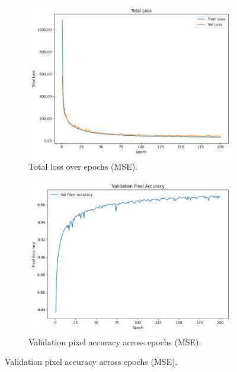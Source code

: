 \begin{figure}[htbp]
    \begin{subfigure}[b]{0.45\textwidth}
        \includegraphics[width=\textwidth]{img/vae_results/200_epochs_128_ls_mse/mse_total_loss.png}
        \caption{Total loss over epochs (MSE).}
        \label{fig:mse_total_loss}
    \end{subfigure}
    \hfill
    \begin{subfigure}[b]{0.45\textwidth}
        \includegraphics[width=\textwidth]{img/vae_results/200_epochs_128_ls_mse/mse_val_accuracy.png}
        \caption{Validation pixel accuracy across epochs (MSE).}
        \label{fig:mse_val_acc}
    \end{subfigure}
    

\end{figure}
